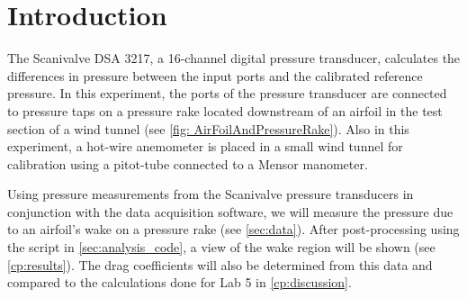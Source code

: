 \chapter{Introduction}
\label{cp:introduction}
The Scanivalve DSA 3217, a \num{16}-channel digital pressure transducer, calculates the differences in pressure between the input ports and the calibrated reference pressure. In this experiment, the ports of the pressure transducer are connected to pressure taps on a pressure rake located downstream of an airfoil in the test section of a wind tunnel (see \autoref{fig: AirFoilAndPressureRake}). Also in this experiment, a hot-wire anemometer is placed in a small wind tunnel for calibration using a pitot-tube connected to a Mensor manometer.

Using pressure measurements from the Scanivalve pressure transducers in conjunction with the data acquisition software, we will measure the pressure due to an airfoil's wake on a pressure rake (see \autoref{sec:data}). After post-processing using the script in \autoref{sec:analysis_code}, a view of the wake region will be shown (see \autoref{cp:results}). The drag coefficients will also be determined from this data and compared to the calculations done for Lab 5 in \autoref{cp:discussion}.
